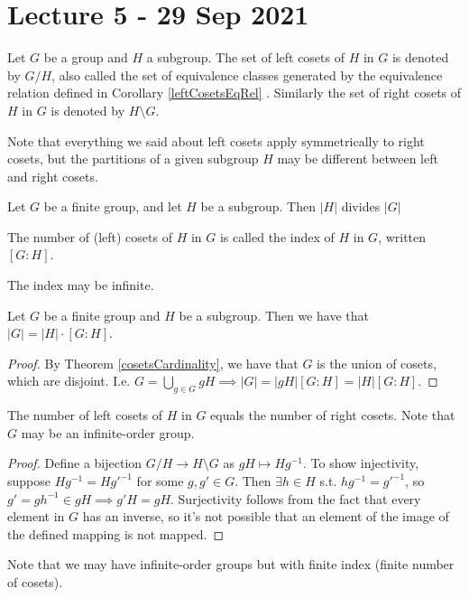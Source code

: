\section{Lecture 5 - 29 Sep 2021}
\begin{definition}
  Let $G$ be a group and $H$ a subgroup. The set of left cosets of $H$ in $G$ is denoted
  by $G/H$, also called the set of equivalence classes generated by the equivalence
  relation defined in Corollary \ref{leftCosetsEqRel} . Similarly the set of right cosets of
  $H$ in $G$ is denoted by $H\setminus G$.
  \label{cosets}
\end{definition}
Note that everything we said about left cosets apply symmetrically to right cosets, but
the partitions of a given subgroup $H$ may be different between left and right cosets.

\begin{corollary}
  Let $G$ be a finite group, and let $H$ be a subgroup. Then $|H|$ divides $|G|$
\end{corollary}

\begin{definition}
  The number of (left) cosets of $H$ in $G$ is called the index of $H$ in $G$, written
  $[G:H]$.
\end{definition}
The index may be infinite.

\begin{corollary}
  Let $G$ be a finite group and $H$ be a subgroup. Then we have that $|G|=|H| \cdot [G:H]$.
  \label{lagrange}
\end{corollary}
\begin{proof}
  By Theorem \ref{cosetsCardinality}, we have that $G$ is the union of cosets, which are
  disjoint. I.e. $G=\bigcup_{g\in G} gH\implies |G|=|gH|[G:H]=|H|[G:H]$.
\end{proof}

\begin{theorem}
  The number of left cosets of $H$ in $G$ equals the number of right cosets. Note that $G$
  may be an infinite-order group.
\end{theorem}
\begin{proof}
  Define a bijection $G/H\to H\setminus G$ as $gH\mapsto Hg^{-1}$. To show injectivity,
  suppose $Hg^{-1}=Hg'^{-1}$ for some $g,g'\in G$. Then $\exists h\in H$ s.t.
  $hg^{-1} = g'^{-1}$, so $g' = gh^{-1}\in gH \implies g'H=gH$. Surjectivity follows from
  the fact that every element in $G$ has an inverse, so it's not possible that an element
  of the image of the defined mapping is not mapped.
\end{proof}
Note that we may have infinite-order groups but with finite index (finite number of
cosets).

